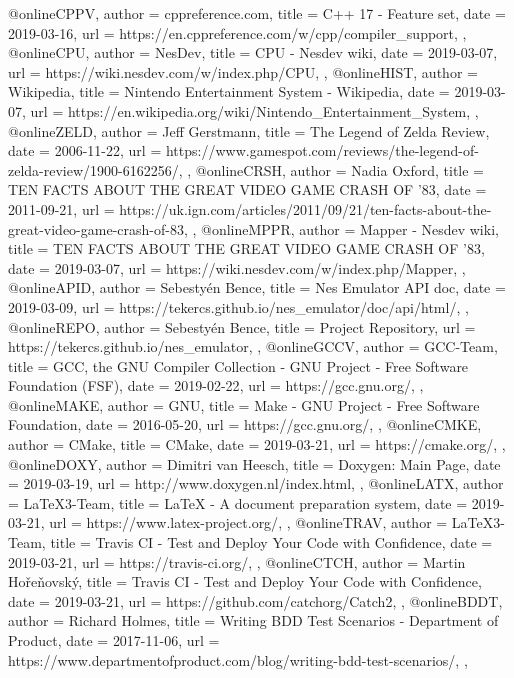 @online{CPPV,
	author = {cppreference.com},
	title = {C++ 17 - Feature set},
	date = {2019-03-16},
	url = {https://en.cppreference.com/w/cpp/compiler_support},
},
@online{CPU,
	author = {NesDev},
	title = {CPU - Nesdev wiki},
	date = {2019-03-07},
	url = {https://wiki.nesdev.com/w/index.php/CPU},
},
@online{HIST,
	author = {Wikipedia},
	title = {Nintendo Entertainment System - Wikipedia},
	date = {2019-03-07},
	url = {https://en.wikipedia.org/wiki/Nintendo_Entertainment_System},
},
@online{ZELD,
	author = {Jeff Gerstmann},
	title = {The Legend of Zelda Review},
	date = {2006-11-22},
	url = {https://www.gamespot.com/reviews/the-legend-of-zelda-review/1900-6162256/},
},
@online{CRSH,
	author = {Nadia Oxford},
	title = {TEN FACTS ABOUT THE GREAT VIDEO GAME CRASH OF '83},
	date = {2011-09-21},
	url = {https://uk.ign.com/articles/2011/09/21/ten-facts-about-the-great-video-game-crash-of-83},
},
@online{MPPR,
	author = {Mapper - Nesdev wiki},
	title = {TEN FACTS ABOUT THE GREAT VIDEO GAME CRASH OF '83},
	date = {2019-03-07},
	url = {https://wiki.nesdev.com/w/index.php/Mapper},
},
@online{APID,
	author = {Sebestyén Bence},
	title = {Nes Emulator API doc},
	date = {2019-03-09},
	url = {https://tekercs.github.io/nes_emulator/doc/api/html/},
},
@online{REPO,
	author = {Sebestyén Bence},
	title = {Project Repository},
	url = {https://tekercs.github.io/nes_emulator},
},
@online{GCCV,
	author = {GCC-Team},
	title = {GCC, the GNU Compiler Collection - GNU Project - Free Software Foundation (FSF)},
	date = {2019-02-22},
	url = {https://gcc.gnu.org/},
},
@online{MAKE,
	author = {GNU},
	title = {Make - GNU Project - Free Software Foundation},
	date = {2016-05-20},
	url = {https://gcc.gnu.org/},
},
@online{CMKE,
	author = {CMake},
	title = {CMake},
	date = {2019-03-21},
	url = {https://cmake.org/},
},
@online{DOXY,
	author = {Dimitri van Heesch},
	title = {Doxygen: Main Page},
	date = {2019-03-19},
	url = {http://www.doxygen.nl/index.html},
},
@online{LATX,
	author = {LaTeX3-Team},
	title = {LaTeX - A document preparation system},
	date = {2019-03-21},
	url = {https://www.latex-project.org/},
},
@online{TRAV,
	author = {LaTeX3-Team},
	title = {Travis CI - Test and Deploy Your Code with Confidence},
	date = {2019-03-21},
	url = {https://travis-ci.org/},
},
@online{CTCH,
	author = {Martin Hořeňovský},
	title = {Travis CI - Test and Deploy Your Code with Confidence},
	date = {2019-03-21},
	url = {https://github.com/catchorg/Catch2},
},
@online{BDDT,
	author = {Richard Holmes},
	title = {Writing BDD Test Scenarios - Department of Product},
	date = {2017-11-06},
	url = {https://www.departmentofproduct.com/blog/writing-bdd-test-scenarios/},
},

